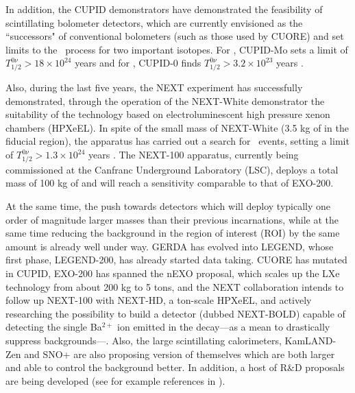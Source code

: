  In addition, the CUPID demonstrators have demonstrated the feasibility of scintillating bolometer detectors, which are currently envisioned as the ``successors" of conventional bolometers (such as those used by CUORE) and set limits to the \bbonu\ process for two important isotopes.
For , CUPID-Mo sets a limit of \mbox{$T^{0\nu}_{1/2} > 18 \times 10^{24}$} years \cite{Augier:2022znx}
and for , CUPID-0 finds \mbox{$T^{0\nu}_{1/2} > 3.2 \times 10^{23}$} years  \cite{CUPID:2022puj}. 

Also, during the last five years, the NEXT experiment has successfully demonstrated, through the operation of the NEXT-White demonstrator the suitability of the technology based on electroluminescent high pressure xenon chambers (HPXeEL). In spite of the small mass of NEXT-White (3.5 kg of  in the fiducial region), the apparatus has carried out a search for \bbonu\ events, setting a limit of \mbox{$T^{0\nu}_{1/2} > 1.3 \times 10^{24}$} years  \cite{NEXT:2023daz}. The NEXT-100 apparatus, currently being commissioned at the Canfranc Underground Laboratory (LSC), deploys a total mass of 100 kg of  and will reach a sensitivity comparable to that of EXO-200.  

At the same time, the push towards detectors which will deploy typically one order of magnitude larger masses than their previous incarnations, while at the same time reducing the background in the region of interest (ROI) by the same amount is already well under way. GERDA has evolved into LEGEND, whose first phase, LEGEND-200, has already started data taking. CUORE has mutated in CUPID, EXO-200 has spanned the nEXO proposal, which scales up the LXe technology from about 200 kg to 5 tons, and the NEXT collaboration intends to follow up NEXT-100 with NEXT-HD, a ton-scale HPXeEL, and actively researching the possibility to build a detector (dubbed NEXT-BOLD) capable of detecting the single Ba$^{2+}$ ion emitted in the decay---as a mean to drastically suppress backgrounds---. Also, the large scintillating calorimeters, KamLAND-Zen and SNO+ are also proposing version of themselves which are both larger and able to control the background better. In addition, a host of R\&D proposals are being developed (see for example references in \cite{Dell_Oro_2016}). 

